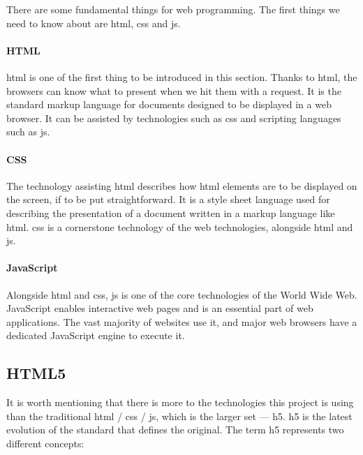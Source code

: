 There are some fundamental things for web programming. The first things we need to know about are \gls{html}, \gls{css} and \gls{js}.

\paragraph{HTML}

\gls{html} is one of the first thing to be introduced in this section. Thanks to \gls{html}, the browsers can know what to present when we hit them with a request. It is the standard markup language for documents designed to be displayed in a web browser. It can be assisted by technologies such as \gls{css} and scripting languages such as \gls{js}.\cite{wiki:html}

\paragraph{CSS}


The technology assisting \gls{html} describes how \gls{html} elements are to be displayed on the screen, if to be put straightforward. It is a style sheet language used for describing the presentation of a document written in a markup language like \gls{html}.\cite{wiki:css} \gls{css} is a cornerstone technology of the web technologies, alongside \gls{html} and \gls{js}.\cite{flanagan2006javascript}

\paragraph{JavaScript}


Alongside \gls{html} and \gls{css}, \gls{js} is one of the core technologies of the World Wide Web.\cite{flanagan2006javascript} JavaScript enables interactive web pages and is an essential part of web applications. The vast majority of websites use it,\cite{w3techs2018usage} and major web browsers have a dedicated JavaScript engine to execute it.\cite{wiki:js}

\subsection{HTML5}\label{chap2:html5}

It is worth mentioning that there is more to the technologies this project is using than the traditional \gls{html} / \gls{css} / \gls{js}, which is the larger set --- \gls{h5}. \gls{h5} is the latest evolution of the standard that defines the original. The term \gls{h5} represents two different concepts:

